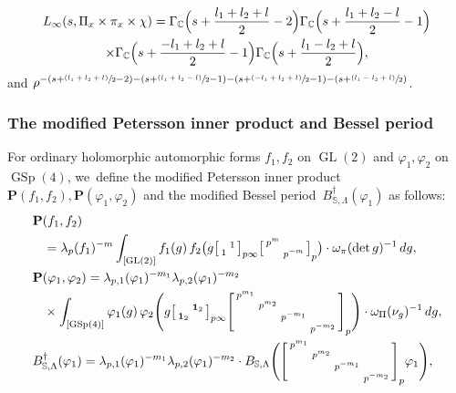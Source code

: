 \documentclass[JEP,XML,SOM,Unicode,published]{cedram}
\newenvironment{smallbmatrix}{\big[\begin{smallmatrix}}{\end{smallmatrix}\big]}
\newcommand{\psfrac}[2]{\sfrac{(#1)}{#2}}
\newenvironment{bsm}
{\left[\begin{smallmatrix}}
{\end{smallmatrix}\right]}
\theoremstyle{plain}
\theoremstyle{remark}
\newcommand{\bC}{\mathbb{C}}
\newcommand{\bS}{\mathbb{S}}
\newcommand{\bfP}{\mathbf{P}}
\DeclareMathOperator{\GL}{GL}
\DeclareMathOperator{\GSp}{GSp}
\let\bes B
\newcommand{\bid}{\mathbf{1}}
\begin{document}
\begin{multline*}
L_\infty(s,\Pi_x\times\pi_x\times\chi)=\Gamma_\bC\Bigl(s+\frac{l_1+l_2+l}{2}-2\Bigr)\Gamma_\bC\Bigl(s+\frac{l_1+l_2-l}{2}-1\Bigr)\\
\times\Gamma_\bC\Bigl(s+\frac{-l_1+l_2+l}{2}-1\Bigr)\Gamma_\bC\Bigl(s+\frac{l_1-l_2+l}{2}\Bigr),
\end{multline*}
and $\rho^{-(s+\psfrac{l_1+l_2+l}{2}-2)-(s+\psfrac{l_1+l_2-l}{2}-1)-(s+\psfrac{-l_1+l_2+l}{2}-1)-(s+\psfrac{l_1-l_2+l}{2})}$.

\subsubsection{The modified Petersson inner product and Bessel period}\label{sec:modper}
For ordinary holomorphic automorphic forms $f_1,f_2$ on $\GL(2)$ and $\varphi_1,\varphi_2$ on $\GSp(4)$, we~define the modified Petersson inner product $\bfP(f_1,f_2),\bfP(\varphi_1,\varphi_2)$ and the modified Bessel \hbox{period}~$\bes^\dagger_{\bS,\Lambda}(\varphi_1)$ as follows:
\begin{align}\label{eq:Pet2}
&\bfP(f_1,f_2)\\
&\hspace*{3mm}=\lambda_p(f_1)^{-m}\int_{[\GL(2)]} f_1(g)\,f_2\bigl(g\begin{smallbmatrix}&1\\1\end{smallbmatrix}_{p\infty} \begin{smallbmatrix}p^{m}\\&p^{-m}\end{smallbmatrix}_p\bigr)\cdot\omega_\pi(\det g)^{-1}\,dg,\notag
\\
&\bfP(\varphi_1,\varphi_2)=\lambda_{p,1}(\varphi_1)^{-m_1}\lambda_{p,2}(\varphi_1)^{-m_2} \label{eq:Pet} \\
&\hspace*{3mm}\times\int_{[\GSp(4)]} \varphi_1(g)\,\varphi_2\Biggl(g\begin{bsm}&\bid_2\\\bid_2\end{bsm}_{p\infty}\begin{bsm}p^{m_1}\\&p^{m_2}\\&&p^{-m_1}\\&&&p^{-m_2}\end{bsm}_p\Biggr)\cdot \omega_\Pi(\nu_g)^{-1} \,dg,\notag\\
&\bes^\dagger_{\bS,\Lambda}(\varphi_1)=
\lambda_{p,1}(\varphi_1)^{-m_1}\lambda_{p,2}(\varphi_1)^{-m_2}
\cdot \bes_{\bS,\Lambda}\Biggl(\begin{bsm}p^{m_1}\\&p^{m_2}\\&&p^{-m_1}\\&&&p^{-m_2}\end{bsm}_p\varphi_1\Biggr),\label{eq:bes-dagger}
\end{align}
\end{document}
